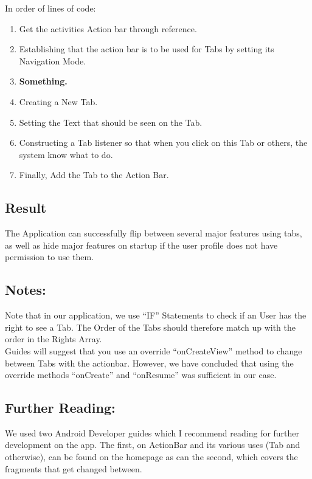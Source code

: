 \noindent In order of lines of code:
\begin{enumerate}
\item Get the activities Action bar through reference.
\item Establishing that the action bar is to be used for Tabs by setting its Navigation Mode.
\item \textbf{Something.}
\item Creating a New Tab.
\item Setting the Text that should be seen on the Tab.
\item Constructing a Tab listener so that when you click on this Tab or others, the system know what to do.
\item Finally, Add the Tab to the Action Bar.
\end{enumerate}

\subsection*{Result}
The Application can successfully flip between several major features using tabs, as well as hide major features on startup if the user profile does not have permission to use them.

\subsection*{Notes:}
Note that in our application, we use ``IF'' Statements to check if an User has the right to see a Tab.
The Order of the Tabs should therefore match up with the order in the Rights Array.\\
Guides will suggest that you use an override ``onCreateView'' method to change between Tabs with the actionbar.
However, we have concluded that using the override methods ``onCreate'' and ``onResume'' was sufficient in our case.

\subsection*{Further Reading:}
We used two Android Developer guides which I recommend reading for further development on the app.
The first, on ActionBar and its various uses (Tab and otherwise), can be found on the homepage \cite{actionbarguide} as can the second, which covers the fragments that get changed between.\cite{fragmentguide}